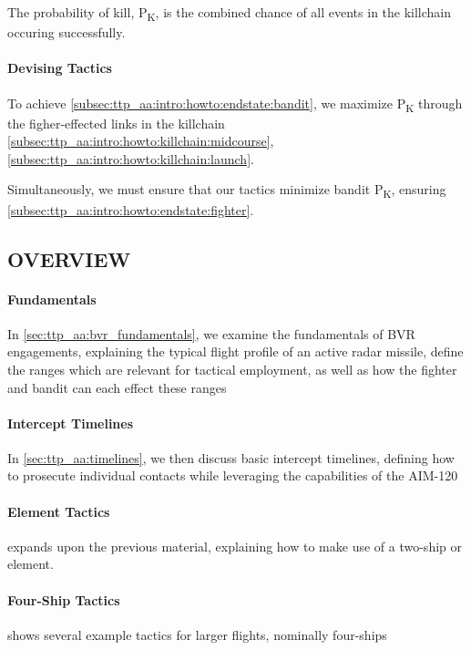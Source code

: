 \medskip
The probability of kill, P\textsubscript{K}, is the combined chance of all events in the killchain occuring successfully.

\paragraph{Devising Tactics}
To achieve \ref{subsec:ttp_aa:intro:howto:endstate:bandit},
we maximize P\textsubscript{K} through the figher-effected links in the killchain
\ref{subsec:ttp_aa:intro:howto:killchain:midcourse},
\ref{subsec:ttp_aa:intro:howto:killchain:launch}.

\medskip
Simultaneously, we must ensure that our tactics minimize bandit P\textsubscript{K}, 
ensuring \ref{subsec:ttp_aa:intro:howto:endstate:fighter}.

\clearpage

\subsection{OVERVIEW}

\paragraph{Fundamentals} 
In \cref{sec:ttp_aa:bvr_fundamentals}, 
we examine the fundamentals of BVR engagements, 
explaining the typical flight profile of an active radar missile,
define the ranges which are relevant for tactical employment,
as well as how the fighter and bandit can each effect these ranges

\paragraph{Intercept \break Timelines}
In \cref{sec:ttp_aa:timelines}, 
we then discuss basic intercept timelines, 
defining how to prosecute individual contacts while leveraging the capabilities of the AIM-120

\paragraph{Element Tactics}
 expands upon the previous material, 
explaining how to make use of a two-ship or element.

\paragraph{Four-Ship \break Tactics}
 shows several example tactics for larger flights, nominally four-ships

\clearpage